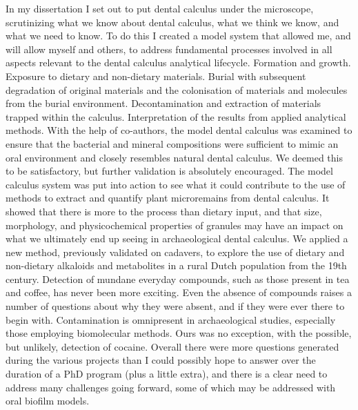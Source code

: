 \documentclass[
  letterpaper,
]{book}
\begin{document}
In my dissertation I set out to put dental calculus under the
microscope, scrutinizing what we know about dental calculus, what we
think we know, and what we need to know. To do this I created a model
system that allowed me, and will allow myself and others, to address
fundamental processes involved in all aspects relevant to the dental
calculus analytical lifecycle. Formation and growth. Exposure to dietary
and non-dietary materials. Burial with subsequent degradation of
original materials and the colonisation of materials and molecules from
the burial environment. Decontamination and extraction of materials
trapped within the calculus. Interpretation of the results from applied
analytical methods. With the help of co-authors, the model dental
calculus was examined to ensure that the bacterial and mineral
compositions were sufficient to mimic an oral environment and closely
resembles natural dental calculus. We deemed this to be satisfactory,
but further validation is absolutely encouraged. The model calculus
system was put into action to see what it could contribute to the use of
methods to extract and quantify plant microremains from dental calculus.
It showed that there is more to the process than dietary input, and that
size, morphology, and physicochemical properties of granules may have an
impact on what we ultimately end up seeing in archaeological dental
calculus. We applied a new method, previously validated on cadavers, to
explore the use of dietary and non-dietary alkaloids and metabolites in
a rural Dutch population from the 19th century. Detection of mundane
everyday compounds, such as those present in tea and coffee, has never
been more exciting. Even the absence of compounds raises a number of
questions about why they were absent, and if they were ever there to
begin with. Contamination is omnipresent in archaeological studies,
especially those employing biomolecular methods. Ours was no exception,
with the possible, but unlikely, detection of cocaine. Overall there
were more questions generated during the various projects than I could
possibly hope to answer over the duration of a PhD program (plus a
little extra), and there is a clear need to address many challenges
going forward, some of which may be addressed with oral biofilm models.
\end{document}
